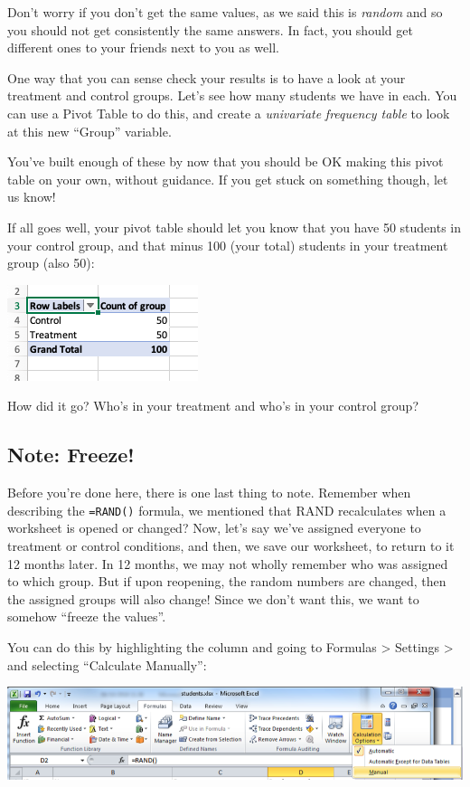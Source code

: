 \documentclass[
]{book}
\begin{document}
Don't worry if you don't get the same values, as we said this is \emph{random} and so you should not get consistently the same answers. In fact, you should get different ones to your friends next to you as well.

One way that you can sense check your results is to have a look at your treatment and control groups. Let's see how many students we have in each. You can use a Pivot Table to do this, and create a \emph{univariate} \emph{frequency table} to look at this new ``Group'' variable.

You've built enough of these by now that you should be OK making this pivot table on your own, without guidance. If you get stuck on something though, let us know!

If all goes well, your pivot table should let you know that you have 50 students in your control group, and that minus 100 (your total) students in your treatment group (also 50):

\includegraphics{imgs/freq_groups.png}

How did it go? Who's in your treatment and who's in your control group?

\hypertarget{note-freeze}{%
\subsection{Note: Freeze!}\label{note-freeze}}

Before you're done here, there is one last thing to note. Remember when describing the \texttt{=RAND()} formula, we mentioned that RAND recalculates when a worksheet is opened or changed? Now, let's say we've assigned everyone to treatment or control conditions, and then, we save our worksheet, to return to it 12 months later. In 12 months, we may not wholly remember who was assigned to which group. But if upon reopening, the random numbers are changed, then the assigned groups will also change! Since we don't want this, we want to somehow ``freeze the values''.

You can do this by highlighting the column and going to Formulas \textgreater{} Settings \textgreater{} and selecting ``Calculate Manually'':

\includegraphics{imgs/calc_man_pc.png}
\end{document}
